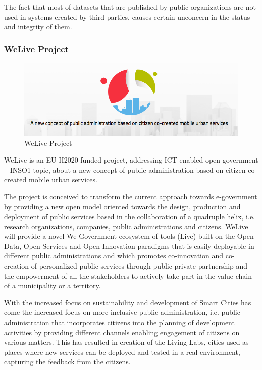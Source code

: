 \documentclass{DeustoFDP}
\begin{document}
The fact that most of datasets that are published by public organizations are not used in systems created by third parties, causes certain unconcern in the status and integrity of them.

\subsubsection{WeLive Project}
\begin{figure}[h]
\centering
\includegraphics[width=0.7\linewidth]{fig/welive}
\caption[WeLive Project]{WeLive Project}
\label{fig:welive}
\end{figure}


WeLive is an EU H2020 funded project, addressing ICT-enabled open government – INSO1 topic, about a new concept of public administration based on citizen co-created mobile urban services.

The project is conceived to transform the current approach towards e-government by providing a new open model oriented towards the design, production and deployment of public services based in the collaboration of a quadruple helix, i.e. research organizations, companies, public administrations and citizens. WeLive will provide a novel We-Government ecosystem of tools (Live) built on the Open Data, Open Services and Open  Innovation paradigms that is easily deployable in different public administrations and which promotes co-innovation and co-creation of personalized public services through public-private partnership and the  empowerment of all the stakeholders to actively take part in the value-chain of a municipality or a territory. \cite{WeLive}

With the increased focus on sustainability and development of Smart Cities has come the increased focus on more inclusive public administration, i.e. public administration that incorporates citizens into the planning of development activities by providing different channels enabling engagement of citizens on various matters. This has resulted in creation of the Living Labs, cities used as places where new services can be deployed and tested in a real environment, capturing the feedback from the citizens.
\end{document}
